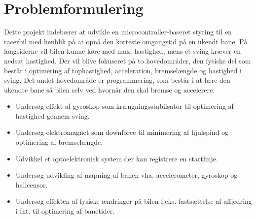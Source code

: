 
\section{Problemformulering}
Dette projekt indebærer at udvikle en microcontroller-baseret styring til en racerbil med henblik på at opnå den korteste omgangstid på en ukendt bane. På langsiderne vil bilen kunne køre med max. hastighed, mens et sving kræver en nedsat hastighed. Der vil blive fokuseret på to hovedområder, den fysiske del som består i optimering af tophastighed, acceleration, bremselængde og hastighed i sving. Det andet hovedområde er programmering, som består i at lære den ukendte bane så bilen selv ved hvornår den skal bremse og accelerere.
\begin{itemize}
\item Undersøg effekt af gyroskop som krængningsstabilsator til optimering af hastighed gennem sving.
\item Undersøg elektromagnet som downforce til minimering af hjulspind og optimering af bremselængde.
\item Udvikkel et optoelektronisk system der kan registrere en startlinje.
\item Undersøg udvikling af mapning af banen vha. accelerometer, gyroskop og hallcensor.
\item Undersøg effekten af fysiske ændringer på bilen f.eks. fastsættelse af affjedring i fht. til optimering af banetider.
\end{itemize}

